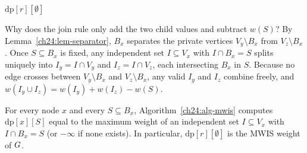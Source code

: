 \begin{algorithm}[H]
\caption{\textsc{MWIS} on a nice tree decomposition}
\label{ch24:alg-mwis}
\Return $\mathrm{dp}[r][\emptyset]$\;
\end{algorithm}

\begin{whybox}
Why does the join rule only add the two child values and subtract $w(S)$? By
Lemma~\ref{ch24:lem-separator}, $B_x$ separates the private vertices
$V_y\setminus B_x$ from $V_z\setminus B_x$. Once $S\subseteq B_x$ is fixed, any
independent set $I\subseteq V_x$ with $I\cap B_x=S$ splits uniquely into
$I_y = I\cap V_y$ and $I_z = I\cap V_z$, each intersecting $B_x$ in $S$. Because no
edge crosses between $V_y\setminus B_x$ and $V_z\setminus B_x$, any valid $I_y$ and
$I_z$ combine freely, and $w(I_y\cup I_z) = w(I_y) + w(I_z) - w(S)$.
\end{whybox}

\begin{theorem}
\label{ch24:thm-mwis}
For every node $x$ and every $S\subseteq B_x$, Algorithm~\ref{ch24:alg-mwis}
computes $\mathrm{dp}[x][S]$ equal to the maximum weight of an independent set
$I\subseteq V_x$ with $I\cap B_x=S$ (or $-\infty$ if none exists). In particular,
$\mathrm{dp}[r][\emptyset]$ is the MWIS weight of $G$.
\end{theorem}

